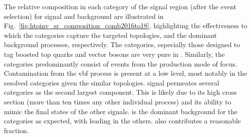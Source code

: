 The relative composition in each category of the signal region (after the event selection) for signal and background are illustrated in Fig.~\ref{fig:htoinv_sr_composition_comb2016to18}, highlighting the effectiveness to which the categories capture the targeted topologies, and the dominant background processes, respectively. The \ttH categories, especially those designed to tag boosted top quarks and vector bosons are very pure in \ttH. Similarly, the \VH categories predominantly consist of events from the production mode of focus. Contamination from the \acrshort{vbf} process is present at a low level, most notably in the resolved categories given the similar topologies. \ggH signal permeates several categories as the second largest component. This is likely due to its high cross section (more than ten times any other individual process) and its ability to mimic the final states of the other signals. \ttbarpjets is the dominant background for the \ttH categories as expected, with \ztonunupjets leading in the others. \wtolnupjets also contributes a reasonable fraction. 

